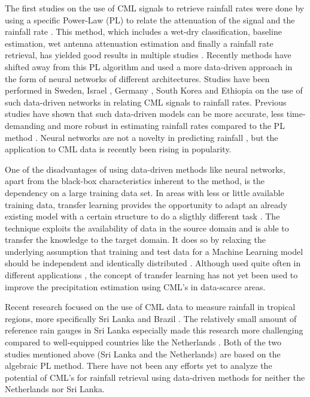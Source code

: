 \documentclass[twocolumn, 10pt, a4paper]{article}
\begin{document}
	The first studies on the use of CML signals to retrieve rainfall rates were done by using a specific Power-Law (PL) to relate the attenuation of the signal and the rainfall rate \cite{Overeem2011,Leijnse2007}. This method, which includes a wet-dry classification, baseline estimation, wet antenna attenuation estimation and finally a rainfall rate retrieval, has yielded good results in multiple studies \cite{deVos2019,Graf2020,Fencl2017}. Recently methods have shifted away from this PL algorithm and used a more data-driven approach in the form of neural networks of different architectures. Studies have been performed in Sweden, Israel \cite{Habi2019}, Germany \cite{Polz2020}, South Korea and Ethiopia \cite{Diba2021} on the use of such data-driven networks in relating CML signals to rainfall rates. Previous studies have shown that such data-driven models can be more accurate, less time-demanding and more robust in estimating rainfall rates compared to the PL method \cite{Polz2020,Pudashine2020}. Neural networks are not a novelty in predicting rainfall \cite{French1992}, but the application to CML data is recently been rising in popularity.
		
	One of the disadvantages of using data-driven methods like neural networks, apart from the black-box characteristics inherent to the method, is the dependency on a large training data set. In areas with less or little available training data, transfer learning provides the opportunity to adapt an already existing model with a certain structure to do a sligthly different task \cite{TanYear}. The technique exploits the availability of data in the source domain and is able to transfer the knowledge to the target domain. It does so by relaxing the underlying assumption that training and test data for a Machine Learning model should be independent and identically distributed \cite{Weiss2016}. Although used quite often in different applications \cite{Zhuang2021}, the concept of transfer learning has not yet been used to improve the precipitation estimation using CML's in data-scarce areas. 
		
	Recent research focused on the use of CML data to measure rainfall in tropical regions, more specifically Sri Lanka \cite{Overeem2021} and Brazil \cite{RiosGaona2017a}. The relatively small amount of reference rain gauges in Sri Lanka especially made this research more challenging compared to well-equipped countries like the Netherlands \cite{Overeem2013}. Both of the two studies mentioned above (Sri Lanka and the Netherlands) are based on the algebraic PL method. There have not been any efforts yet to analyze the potential of CML's for rainfall retrieval using data-driven methods for neither the Netherlands nor Sri Lanka. 
\end{document}
